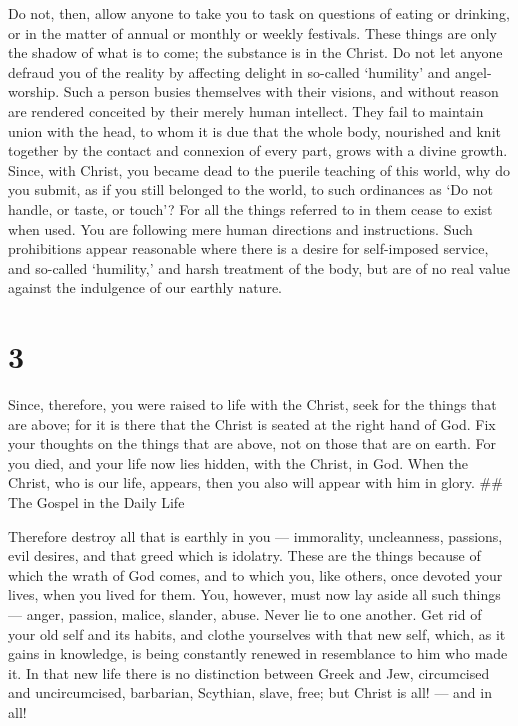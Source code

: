  Do not, then, allow anyone to take you to task on
questions of eating or drinking, or in the matter of annual or monthly
or weekly festivals.  These things are only the shadow of
what is to come; the substance is in the Christ.  Do not
let anyone defraud you of the reality by affecting delight in so-called
`humility' and angel-worship. Such a person busies themselves with their
visions, and without reason are rendered conceited by their merely human
intellect.  They fail to maintain union with the head, to
whom it is due that the whole body, nourished and knit together by the
contact and connexion of every part, grows with a divine growth.
 Since, with Christ, you became dead to the puerile
teaching of this world, why do you submit, as if you still belonged to
the world,  to such ordinances as `Do not handle, or taste,
or touch'?  For all the things referred to in them cease to
exist when used. You are following mere human directions and
instructions.  Such prohibitions appear reasonable where
there is a desire for self-imposed service, and so-called `humility,'
and harsh treatment of the body, but are of no real value against the
indulgence of our earthly nature.

\hypertarget{section-2}{%
\section{3}\label{section-2}}

 Since, therefore, you were raised to life with the Christ,
seek for the things that are above; for it is there that the Christ is
seated at the right hand of God.  Fix your thoughts on the
things that are above, not on those that are on earth.  For
you died, and your life now lies hidden, with the Christ, in God.
 When the Christ, who is our life, appears, then you also
will appear with him in glory. \#\# The Gospel in the Daily Life

 Therefore destroy all that is earthly in you ---
immorality, uncleanness, passions, evil desires, and that greed which is
idolatry.  These are the things because of which the wrath
of God comes,  and to which you, like others, once devoted
your lives, when you lived for them.  You, however, must now
lay aside all such things --- anger, passion, malice, slander, abuse.
 Never lie to one another. Get rid of your old self and its
habits,  and clothe yourselves with that new self, which,
as it gains in knowledge, is being constantly renewed in resemblance to
him who made it.  In that new life there is no distinction
between Greek and Jew, circumcised and uncircumcised, barbarian,
Scythian, slave, free; but Christ is all! --- and in all!

